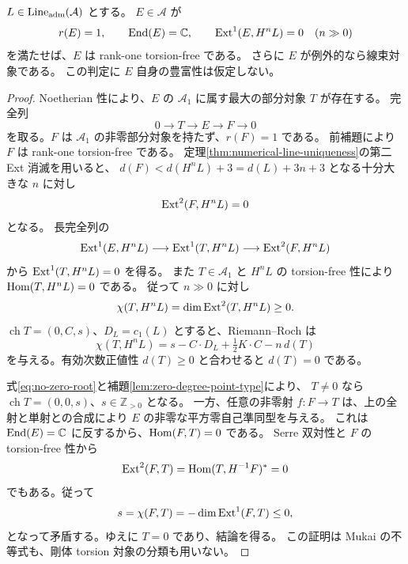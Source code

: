 \begin{proposition}
\label{prop:right-tail-torsionfree-recognition}
$L\in\operatorname{Line}_{\rm adm}(\mathcal A)$ とする。
$E\in\mathcal A$ が
\[
 r(E)=1,\qquad \operatorname{End}(E)=\mathbb C,\qquad
 \operatorname{Ext}^1(E,H^nL)=0\quad(n\gg0)
\]
を満たせば、$E$ は rank-one torsion-free である。
さらに $E$ が例外的なら線束対象である。
この判定に $E$ 自身の豊富性は仮定しない。
\end{proposition}
\begin{proof}
Noetherian 性により、$E$ の $\mathcal A_1$ に属す最大の部分対象 $T$ が存在する。
完全列
\[
 0\longrightarrow T\longrightarrow E\longrightarrow F\longrightarrow0
\]
を取る。$F$ は $\mathcal A_1$ の非零部分対象を持たず、$r(F)=1$ である。
前補題により $F$ は rank-one torsion-free である。
定理\ref{thm:numerical-line-uniqueness}の第二 Ext 消滅を用いると、
$d(F)<d(H^nL)+3=d(L)+3n+3$ となる十分大きな $n$ に対し
\[
 \operatorname{Ext}^2(F,H^nL)=0
\]
となる。
長完全列の
\[
 \operatorname{Ext}^1(E,H^nL)\longrightarrow\operatorname{Ext}^1(T,H^nL)
 \longrightarrow\operatorname{Ext}^2(F,H^nL)
\]
から $\operatorname{Ext}^1(T,H^nL)=0$ を得る。
また $T\in\mathcal A_1$ と $H^nL$ の torsion-free 性により
$\operatorname{Hom}(T,H^nL)=0$ である。
従って $n\gg0$ に対し
\[
 \chi(T,H^nL)=\dim\operatorname{Ext}^2(T,H^nL)\ge0.
\]
$\operatorname{ch}T=(0,C,s)$、$D_L=c_1(L)$ とすると、Riemann--Roch は
\[
 \chi(T,H^nL)
 =s-C\cdot D_L+\tfrac12 K\cdot C-n\,d(T)
\]
を与える。有効次数正値性 $d(T)\ge0$ と合わせると $d(T)=0$ である。

式\eqref{eq:no-zero-root}と補題\ref{lem:zero-degree-point-type}により、
$T\ne0$ なら $\operatorname{ch}T=(0,0,s)$、$s\in\mathbb Z_{>0}$ となる。
一方、任意の非零射 $f:F\to T$ は、上の全射と単射との合成により
$E$ の非零な平方零自己準同型を与える。
これは $\operatorname{End}(E)=\mathbb C$ に反するから、$\operatorname{Hom}(F,T)=0$ である。
Serre 双対性と $F$ の torsion-free 性から
\[
 \operatorname{Ext}^2(F,T)=\operatorname{Hom}(T,H^{-1}F)^*=0
\]
でもある。従って
\[
 s=\chi(F,T)=-\dim\operatorname{Ext}^1(F,T)\le0,
\]
となって矛盾する。ゆえに $T=0$ であり、結論を得る。
この証明は Mukai の不等式も、剛体 torsion 対象の分類も用いない。
\end{proof}

